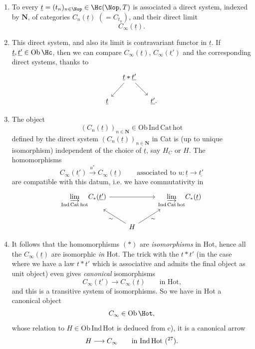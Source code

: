 \begin{enumerate}
\item[a)] To every $\underline{t} = (t_n)_{n \in \Nop} \in \Hc(\Nop, T)$ is associated a direct system, indexed by $\mathbf{N}$, of categories $C_n(\underline{t})$ $(= C_{t_n})$, and their direct limit
\[
C_\infty(\underline{t}).
\]

\item[b)] This direct system, and also its limit is contravariant functor in $\underline{t}$. If $\underline{t}, \underline{t'} \in \mathrm{Ob}\,\Hc$, then we can compare $C_\infty(\underline{t})$, $C_\infty(\underline{t'})$ and the corresponding direct systems, thanks to
\[
\begin{tikzcd}[column sep=small]
 & \underline{t} * \underline{t'} \arrow[ld] \arrow[rd] & \\
\underline{t} & & \underline{t'}.
\end{tikzcd}
\]

\item[c)] The object
\[
(C_n(\underline{t}))_{n \in \mathbf{N}} \in \mathrm{Ob\,Ind\,Cat\,hot}
\]
defined by the direct system $(C_n(\underline{t}))_{n \in \mathbf{N}}$ in Cat is (up to unique isomorphism) independent of the choice of $\underline{t}$, say $H_C$ or $H$. The homomorphisms
\[
C_\infty(\underline{t'}) \xrightarrow{u^*} C_\infty(\underline{t}) \qquad \text{associated to } u : \underline{t} \longrightarrow \underline{t'} \tag*{$(*)$}
\]
are compatible with this datum, i.e. we have commutativity in
\[
\begin{tikzcd}
\underset{\mathrm{Ind\,Cat\,hot}}{\varinjlim} C_*(\underline{t'}) \arrow[rr] & & \underset{\mathrm{Ind\,Cat\,hot}}{\varinjlim} C_*(\underline{t}) \\
 & H \arrow[lu, "\sim"] \arrow[ru, "\sim"'] &
\end{tikzcd}
\]

\item[d)] It follows that the homomorphisms $(*)$ are \textit{isomorphisms} in Hot, hence all the $C_\infty(\underline{t})$ are isomorphic \textit{in} Hot. The trick with the $t * t'$ (in the case where we have a law $t * t'$ which is associative and admits the final object as unit object) even gives \textit{canonical} isomorphisms
\[
C_\infty(\underline{t'}) \longrightarrow C_\infty(\underline{t}) \qquad \text{in Hot,}
\]
and this is a transitive system of isomorphisms. So we have in Hot a canonical object
\[
C_\infty \in \mathrm{Ob}\,\Hot,
\]
whose relation to $H \in \mathrm{Ob\,Ind\,Hot}$ is deduced from c), it is a canonical arrow
\[
H \longrightarrow C_\infty \qquad \text{in Ind\,Hot (\footnotemark[27]).}
\]


\end{enumerate}
